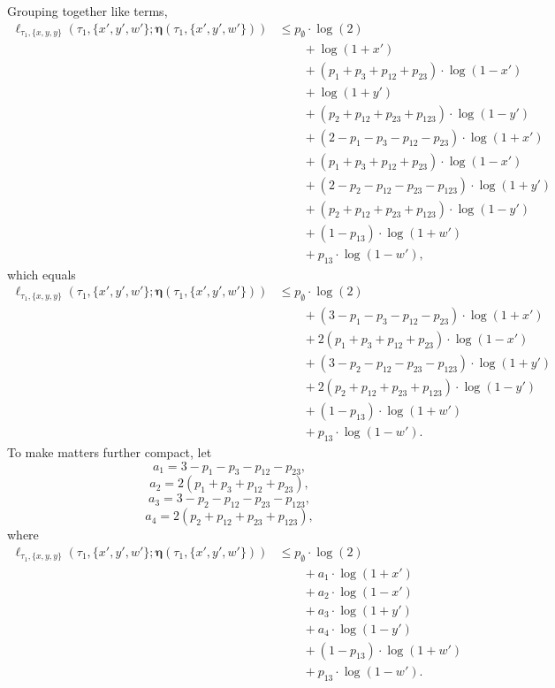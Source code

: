 \documentclass{article}
\newcommand{\fullAncestralSplitPartitions}{\boldsymbol\eta}
\begin{document}
Grouping together like terms,
\begin{align*}
    \ell_{\tau_1,\{x,y,y\}}(\tau_1, \{x',y',w'\}; \fullAncestralSplitPartitions(\tau_1,\{x',y',w'\}))
    &\le      p_{\emptyset}  \cdot\log(2) \\
    &\qquad + \log(1+x') \\
    &\qquad + (p_{1}+p_{3}+p_{12}+p_{23})\cdot\log(1-x') \\
    &\qquad + \log(1+y') \\
    &\qquad + (p_{2}+p_{12}+p_{23}+p_{123})\cdot\log(1-y') \\
    &\qquad + (2-p_{1}-p_{3}-p_{12}-p_{23})\cdot\log(1+x') \\
    &\qquad + (p_{1}+p_{3}+p_{12}+p_{23})\cdot\log(1-x') \\
    &\qquad + (2-p_{2}-p_{12}-p_{23}-p_{123})\cdot\log(1+y') \\
    &\qquad + (p_{2}+p_{12}+p_{23}+p_{123})\cdot\log(1-y') \\
    &\qquad + (1-p_{13})\cdot\log(1+w') \\
    &\qquad + p_{13}\cdot\log(1-w'),
\end{align*}
which equals
\begin{align*}
    \ell_{\tau_1,\{x,y,y\}}(\tau_1, \{x',y',w'\}; \fullAncestralSplitPartitions(\tau_1,\{x',y',w'\}))
    &\le      p_{\emptyset}  \cdot\log(2) \\
    &\qquad + (3-p_{1}-p_{3}-p_{12}-p_{23})\cdot\log(1+x') \\
    &\qquad + 2(p_{1}+p_{3}+p_{12}+p_{23})\cdot\log(1-x') \\
    &\qquad + (3-p_{2}-p_{12}-p_{23}-p_{123})\cdot\log(1+y') \\
    &\qquad + 2(p_{2}+p_{12}+p_{23}+p_{123})\cdot\log(1-y') \\
    &\qquad + (1-p_{13})\cdot\log(1+w') \\
    &\qquad + p_{13}\cdot\log(1-w').
\end{align*}
To make matters further compact, let
$$
a_{1} = 3-p_{1}-p_{3}-p_{12}-p_{23},
$$
$$
a_{2} = 2(p_{1}+p_{3}+p_{12}+p_{23}),
$$
$$
a_{3} = 3-p_{2}-p_{12}-p_{23}-p_{123},
$$
$$
a_{4} = 2(p_{2}+p_{12}+p_{23}+p_{123}),
$$
where
\begin{align*}
    \ell_{\tau_1,\{x,y,y\}}(\tau_1, \{x',y',w'\}; \fullAncestralSplitPartitions(\tau_1,\{x',y',w'\}))
    &\le      p_{\emptyset}  \cdot\log(2) \\
    &\qquad + a_{1}\cdot\log(1+x') \\
    &\qquad + a_{2}\cdot\log(1-x') \\
    &\qquad + a_{3}\cdot\log(1+y') \\
    &\qquad + a_{4}\cdot\log(1-y') \\
    &\qquad + (1-p_{13})\cdot\log(1+w') \\
    &\qquad + p_{13}\cdot\log(1-w').
\end{align*}
\end{document}
